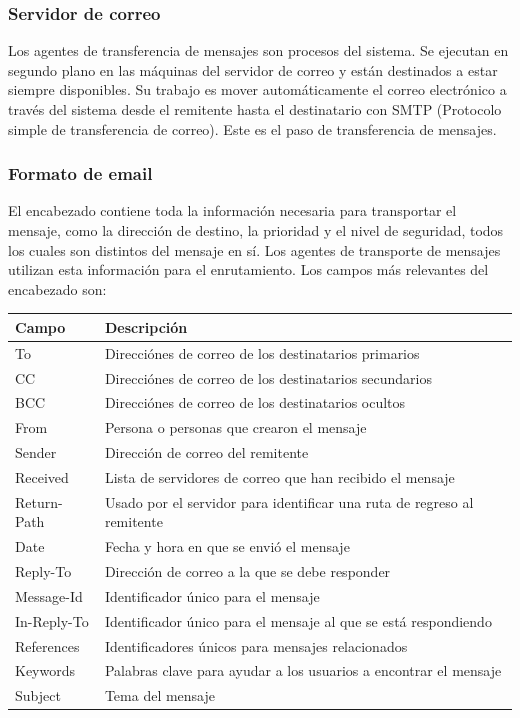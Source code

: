 \subsubsection{Servidor de correo}
Los agentes de transferencia de mensajes son procesos del sistema. Se ejecutan en segundo plano en las máquinas del servidor de correo y están destinados a estar siempre disponibles. Su trabajo es mover automáticamente el correo electrónico a través del sistema desde el remitente hasta el destinatario con SMTP (Protocolo simple de transferencia de correo). Este es el paso de transferencia de mensajes.

\subsubsection{Formato de email}
El encabezado contiene toda la información necesaria para transportar el mensaje, como la dirección de destino, la prioridad y el nivel de seguridad, todos los cuales son distintos del mensaje en sí. Los agentes de transporte de mensajes utilizan esta información para el enrutamiento. Los campos más relevantes del encabezado son:
\begin{center}
  \begin{tabularx}{0.8\textwidth}{l|p{}}
    \textbf{Campo} & \textbf{Descripción} \\
    \hline
    To & Direcciónes de correo de los destinatarios primarios \\
    CC & Direcciónes de correo de los destinatarios secundarios \\
    BCC & Direcciónes de correo de los destinatarios ocultos \\
    From & Persona o personas que crearon el mensaje \\
    Sender & Dirección de correo del remitente \\
    Received & Lista de servidores de correo que han recibido el mensaje \\
    Return-Path & Usado por el servidor para identificar una ruta de regreso al remitente \\
    Date & Fecha y hora en que se envió el mensaje \\
    Reply-To & Dirección de correo a la que se debe responder \\
    Message-Id & Identificador único para el mensaje \\
    In-Reply-To & Identificador único para el mensaje al que se está respondiendo \\
    References & Identificadores únicos para mensajes relacionados \\
    Keywords & Palabras clave para ayudar a los usuarios a encontrar el mensaje \\
    Subject & Tema del mensaje \\
  \end{tabularx}
\end{center}

